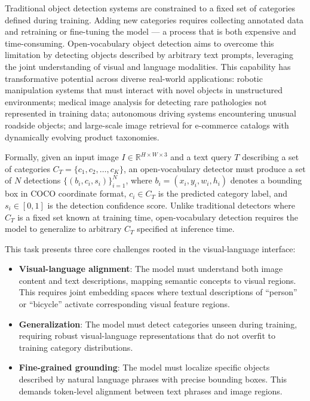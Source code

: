 \documentclass[10pt,journal,final,twocolumn]{IEEEtran}
\begin{document}
Traditional object detection systems are constrained to a fixed set of categories defined during training. Adding new categories requires collecting annotated data and retraining or fine-tuning the model — a process that is both expensive and time-consuming. Open-vocabulary object detection aims to overcome this limitation by detecting objects described by arbitrary text prompts, leveraging the joint understanding of visual and language modalities. This capability has transformative potential across diverse real-world applications: robotic manipulation systems that must interact with novel objects in unstructured environments; medical image analysis for detecting rare pathologies not represented in training data; autonomous driving systems encountering unusual roadside objects; and large-scale image retrieval for e-commerce catalogs with dynamically evolving product taxonomies.

Formally, given an input image $I \in \mathbb{R}^{H \times W \times 3}$ and a text query $T$ describing a set of categories $C_T = \{c_1, c_2, \ldots, c_K\}$, an open-vocabulary detector must produce a set of $N$ detections $\{(b_i, c_i, s_i)\}_{i=1}^N$, where $b_i = (x_i, y_i, w_i, h_i)$ denotes a bounding box in COCO coordinate format, $c_i \in C_T$ is the predicted category label, and $s_i \in [0,1]$ is the detection confidence score. Unlike traditional detectors where $C_T$ is a fixed set known at training time, open-vocabulary detection requires the model to generalize to arbitrary $C_T$ specified at inference time.

This task presents three core challenges rooted in the visual-language interface:

\begin{itemize}
    \item \textbf{Visual-language alignment}: The model must understand both image content and text descriptions, mapping semantic concepts to visual regions. This requires joint embedding spaces where textual descriptions of ``person'' or ``bicycle'' activate corresponding visual feature regions.
    \item \textbf{Generalization}: The model must detect categories unseen during training, requiring robust visual-language representations that do not overfit to training category distributions.
    \item \textbf{Fine-grained grounding}: The model must localize specific objects described by natural language phrases with precise bounding boxes. This demands token-level alignment between text phrases and image regions.
\end{itemize}
\end{document}

